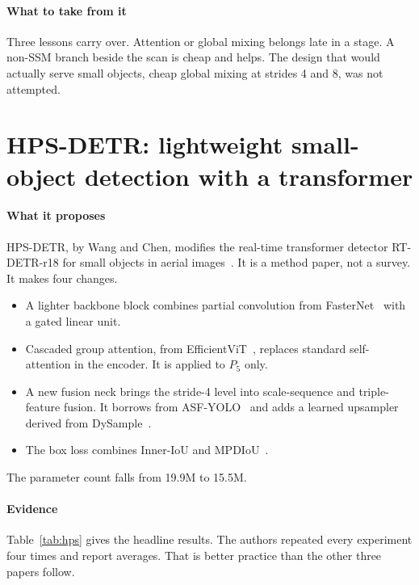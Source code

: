 \paragraph{What to take from it}
Three lessons carry over. Attention or global mixing belongs late in a
stage. A non-SSM branch beside the scan is cheap and helps. The design that
would actually serve small objects, cheap global mixing at strides 4 and 8,
was not attempted.

\section{HPS-DETR: lightweight small-object detection with a transformer}
\label{sec:src-hps}

\paragraph{What it proposes}
HPS-DETR, by Wang and Chen, modifies the real-time transformer detector
RT-DETR-r18 for small objects in aerial images~\citep{wang2025hpsdetr,zhao2024rtdetr}.
It is a method paper, not a survey. It makes four changes.
\begin{itemize}
  \item A lighter backbone block combines partial convolution from
        FasterNet~\citep{chen2023fasternet} with a gated linear unit.
  \item Cascaded group attention, from EfficientViT~\citep{liu2023efficientvit},
        replaces standard self-attention in the encoder. It is applied to
        $P_5$ only.
  \item A new fusion neck brings the stride-4 level into scale-sequence and
        triple-feature fusion. It borrows from ASF-YOLO~\citep{kang2024asfyolo}
        and adds a learned upsampler derived from DySample~\citep{liu2023dysample}.
  \item The box loss combines Inner-IoU and MPDIoU~\citep{zhang2023inneriou,ma2023mpdiou}.
\end{itemize}
The parameter count falls from 19.9M to 15.5M.

\paragraph{Evidence}
Table~\ref{tab:hps} gives the headline results. The authors repeated every
experiment four times and report averages. That is better practice than the
other three papers follow.

